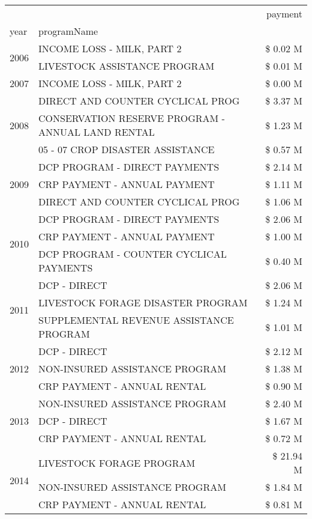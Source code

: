 \begin{tabular}{llr}
\toprule
 &  & payment \\
year & programName &  \\
\midrule
\multirow[t]{2}{*}{2006} & INCOME LOSS - MILK, PART 2 & \$ 0.02 M \\
 & LIVESTOCK ASSISTANCE PROGRAM & \$ 0.01 M \\
\cline{1-3}
2007 & INCOME LOSS - MILK, PART 2 & \$ 0.00 M \\
\cline{1-3}
\multirow[t]{3}{*}{2008} & DIRECT AND COUNTER CYCLICAL PROG & \$ 3.37 M \\
 & CONSERVATION RESERVE PROGRAM - ANNUAL LAND RENTAL & \$ 1.23 M \\
 & 05 - 07 CROP DISASTER ASSISTANCE & \$ 0.57 M \\
\cline{1-3}
\multirow[t]{3}{*}{2009} & DCP PROGRAM - DIRECT PAYMENTS & \$ 2.14 M \\
 & CRP PAYMENT - ANNUAL PAYMENT & \$ 1.11 M \\
 & DIRECT AND COUNTER CYCLICAL PROG & \$ 1.06 M \\
\cline{1-3}
\multirow[t]{3}{*}{2010} & DCP PROGRAM - DIRECT PAYMENTS & \$ 2.06 M \\
 & CRP PAYMENT - ANNUAL PAYMENT & \$ 1.00 M \\
 & DCP PROGRAM - COUNTER CYCLICAL PAYMENTS & \$ 0.40 M \\
\cline{1-3}
\multirow[t]{3}{*}{2011} & DCP - DIRECT & \$ 2.06 M \\
 & LIVESTOCK FORAGE DISASTER PROGRAM & \$ 1.24 M \\
 & SUPPLEMENTAL REVENUE ASSISTANCE PROGRAM & \$ 1.01 M \\
\cline{1-3}
\multirow[t]{3}{*}{2012} & DCP - DIRECT & \$ 2.12 M \\
 & NON-INSURED ASSISTANCE PROGRAM & \$ 1.38 M \\
 & CRP PAYMENT - ANNUAL RENTAL & \$ 0.90 M \\
\cline{1-3}
\multirow[t]{3}{*}{2013} & NON-INSURED ASSISTANCE PROGRAM & \$ 2.40 M \\
 & DCP - DIRECT & \$ 1.67 M \\
 & CRP PAYMENT - ANNUAL RENTAL & \$ 0.72 M \\
\cline{1-3}
\multirow[t]{3}{*}{2014} & LIVESTOCK FORAGE PROGRAM & \$ 21.94 M \\
 & NON-INSURED ASSISTANCE PROGRAM & \$ 1.84 M \\
 & CRP PAYMENT - ANNUAL RENTAL & \$ 0.81 M \\
\cline{1-3}

\end{tabular}
